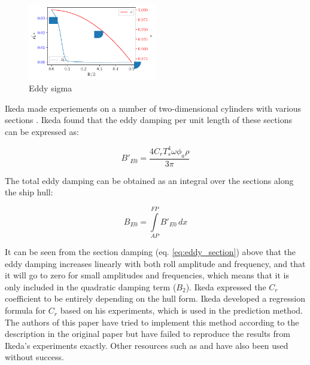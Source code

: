     \begin{figure}[H]
        \begin{center}\includegraphics[width = 0.5\textwidth]{figures/eddy_sigma.pdf}\end{center}
        \vspace{-1cm}
        \caption{Eddy sigma}
        \label{fig:eddy_sigma}
    \end{figure}
    
    Ikeda made experiements on a number of two-dimensional cylinders with
various sections \cite{7505983/4AFVVGNT}. Ikeda found that the eddy
damping per unit length of these sections can be expressed as: 
 
            
    
    \begin{equation}
B'_{E0} = \frac{4 C_{r} T_{s}^{4} \omega \phi_{a} \rho}{3 \pi}
\label{eq:eddy_section}
\end{equation}

    

    The total eddy damping can be obtained as an integral over the sections
along the ship hull:
 
            
    
    \begin{equation}
B_{E0} = \int\limits_{AP}^{FP} B'_{E0}\, dx
\label{eq:equation}
\end{equation}

    

    It can be seen from the section damping (eq.
\ref{eq:eddy_section}) above that the eddy damping increases
linearly with both roll amplitude and frequency, and that it will go to
zero for small amplitudes and frequencies, which means that it is only
included in the quadratic damping term ($B_2$). Ikeda expressed the
$C_r$ coefficient to be entirely depending on the hull form. Ikeda
developed a regression formula for $C_r$ based on his experiments,
which is used in the prediction method. The authors of this paper have
tried to implement this method according to the description in the
original paper \cite{7505983/4AFVVGNT} but have failed to reproduce the
results from Ikeda's experiments exactly. Other resources such as
\cite{7505983/FB64RGPF} and \cite{7505983/KAKIM2E2} have also been used
without success.

